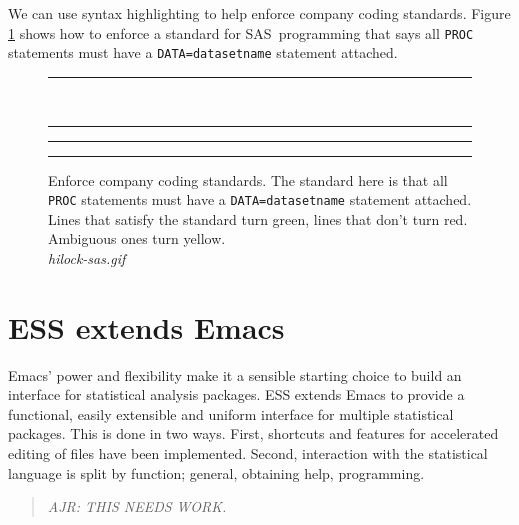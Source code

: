 \documentclass{article}
\newcommand*{\SAS}{\textsc{SAS}}
\newcommand{\stexttt}[1]{{\small\texttt{#1}}}
\newcommand{\emptyfig}{
\hspace*{42pt}\rule{324pt}{.25pt}\\
\hspace*{42pt}\rule{.25pt}{10pc}
\rule{316pt}{.25pt}
\rule{.25pt}{10pc}}
\newenvironment{Comment}{\begin{quote}\small\itshape }{\end{quote}}
\begin{document}
We can use syntax highlighting to help enforce company coding
standards.  Figure \ref{f.hilock} shows how to enforce a standard for
\SAS\ programming that says all \stexttt{PROC} statements must have a
\stexttt{DATA=datasetname} statement attached.

\begin{figure}
\emptyfig
\caption[place holder for a long caption]{Enforce company coding
standards.  The standard here is that all \stexttt{PROC} statements must have
a \stexttt{DATA=datasetname} statement attached.  Lines that satisfy the standard
turn green, lines that don't turn red.  Ambiguous ones turn yellow.\\
{\it hilock-sas.gif}
\label{f.hilock}}
\end{figure}


\section{ESS extends Emacs}
\label{sec:ess-extends-emacs}

Emacs' power and flexibility make it a sensible starting choice to
build an interface for statistical analysis packages.  ESS extends
Emacs to provide a functional, easily extensible and uniform interface
for multiple statistical packages.  This is done in two ways.  First,
shortcuts and features for accelerated editing of files have been
implemented.  Second, interaction with the statistical
language is split by function; general, obtaining help, programming.

\begin{Comment}
AJR: THIS NEEDS WORK.
\end{Comment}



\end{document}
